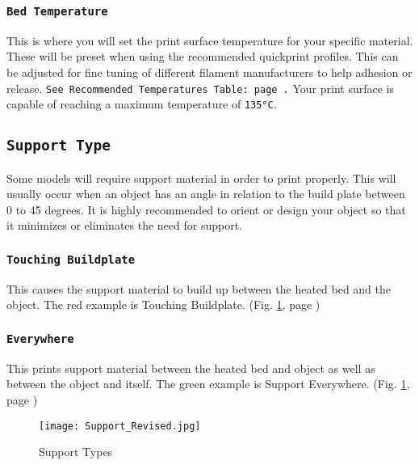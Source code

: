 \subsubsection{\texttt{Bed Temperature}}
This is where you will set the print surface temperature for your specific material. These will be preset when using the recommended quickprint profiles. This can be adjusted for fine tuning of different filament manufacturers to help adhesion or release. \texttt{See Recommended Temperatures Table: page \pageref{tab:a}.} Your print surface is capable of reaching a maximum temperature of \texttt{135°C}. 

\subsection{\texttt{Support Type}}
Some models will require support material in order to print properly. This will usually occur when an object has an angle in relation to the build plate between 0 to 45 degrees. It is highly recommended to orient or design your object so that it minimizes or eliminates the need for support.

\subsubsection{\texttt{Touching Buildplate}}
This causes the support material to build up between the heated bed and the object. The red example is Touching Buildplate. (Fig. \ref{fig:Different Types of Support}, page \pageref{fig:Different Types of Support}) 

\subsubsection{\texttt{Everywhere}}
This prints support material between the heated bed and object as well as between the object and itself. The green example is Support Everywhere. (Fig. \ref{fig:Different Types of Support}, page \pageref{fig:Different Types of Support})
\begin{figure}[H]
\centering
\texttt{[image: Support\_Revised.jpg]}
\caption{Support Types}
\label{fig:Different Types of Support}
\end{figure}

